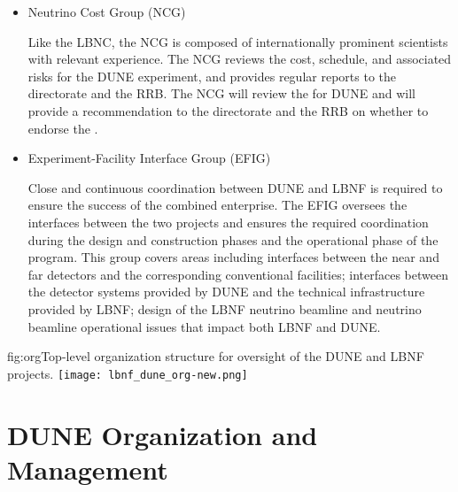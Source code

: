 \begin{itemize}

Upon request from the Fermilab director, the LBNC may employ additional DUNE and LBNF scrutiny groups for more detailed reports and evaluations. 

\item Neutrino Cost Group (NCG)

Like the LBNC, the NCG is composed of internationally prominent scientists with relevant experience.  The NCG reviews the cost, schedule, and associated risks for the DUNE experiment, and provides regular reports to the \fnal directorate and the RRB.  The NCG will review the  for DUNE and will provide a recommendation to the \fnal directorate and the RRB on whether to endorse the .


\item Experiment-Facility Interface Group (EFIG)

Close and continuous coordination between DUNE and LBNF is required to ensure the success of the combined enterprise. The EFIG  oversees the interfaces between the two projects and ensures the required coordination during the design and construction phases and the operational phase of the program. This group covers areas including interfaces between the near and far detectors and the corresponding conventional facilities; interfaces between the detector systems provided by DUNE and the technical infrastructure provided by LBNF; design of the LBNF neutrino beamline and neutrino beamline operational issues that impact both LBNF and DUNE.  

\end{itemize}

\begin{dunefigure}	
{fig:org}{Top-level organization structure for oversight of the DUNE and LBNF projects.}
\texttt{[image: lbnf\_dune\_org-new.png]}  %
\end{dunefigure}

\section{DUNE Organization and Management}

